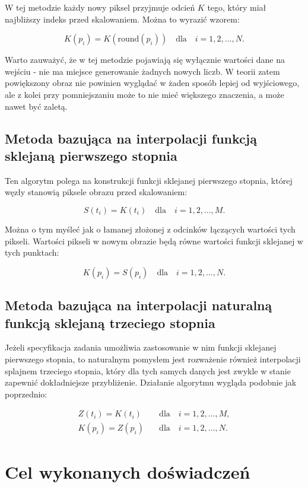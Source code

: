 \documentclass{article}
\begin{document}
W tej metodzie każdy nowy piksel przyjmuje odcień $K$ tego, który miał najbliższy indeks przed skalowaniem. Można to wyrazić wzorem:

$$K(p_i) = K(\text{round}(p_i)) \quad \text{dla} \quad i = 1, 2, \dots, N.$$

Warto zauważyć, że w tej metodzie pojawiają się wyłącznie wartości dane na wejściu - nie ma miejsce generowanie żadnych nowych liczb. W teorii zatem powiększony obraz nie powinien wyglądać w żaden sposób lepiej od wyjściowego, ale z kolei przy pomniejszaniu może to nie mieć większego znaczenia, a może nawet być zaletą.

\subsection{Metoda bazująca na interpolacji funkcją sklejaną pierwszego stopnia}

Ten algorytm polega na konstrukcji funkcji sklejanej pierwszego stopnia, której węzły stanowią piksele obrazu przed skalowaniem:

$$S(t_i) = K(t_i) \quad \text{dla} \quad i = 1, 2, \dots, M.$$

Można o tym myśleć jak o łamanej złożonej z odcinków łączących wartości tych pikseli. Wartości pikseli w nowym obrazie będą równe wartości funkcji sklejanej w tych punktach:

$$K(p_i) = S(p_i) \quad \text{dla} \quad i = 1, 2, \dots, N.$$

\subsection{Metoda bazująca na interpolacji naturalną funkcją sklejaną trzeciego stopnia}

Jeżeli specyfikacja zadania umożliwia zastosowanie w nim funkcji sklejanej pierwszego stopnia, to naturalnym pomysłem jest rozważenie również interpolacji splajnem trzeciego stopnia, który dla tych samych danych jest zwykle w stanie zapewnić dokładniejsze przybliżenie. Działanie algorytmu wygląda podobnie jak poprzednio:

\begin{align*}
    Z(t_i) = K(t_i) \quad &\text{dla} \quad i = 1, 2, \dots, M,\\
    K(p_i) = Z(p_i) \quad &\text{dla} \quad i = 1, 2, \dots, N.
\end{align*}

\section{Cel wykonanych doświadczeń}
\end{document}
